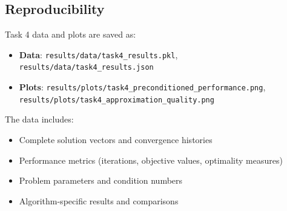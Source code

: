 \documentclass[11pt,a4paper]{article}
\begin{document}
\subsection{Reproducibility}
Task 4 data and plots are saved as:
\begin{itemize}
    \item \textbf{Data}: \texttt{results/data/task4\_results.pkl}, \texttt{results/data/task4\_results.json}
    \item \textbf{Plots}: \texttt{results/plots/task4\_preconditioned\_performance.png}, \texttt{results/plots/task4\_approximation\_quality.png}
\end{itemize}

The data includes:
\begin{itemize}
    \item Complete solution vectors and convergence histories
    \item Performance metrics (iterations, objective values, optimality measures)
    \item Problem parameters and condition numbers
    \item Algorithm-specific results and comparisons
\end{itemize}
\end{document}

